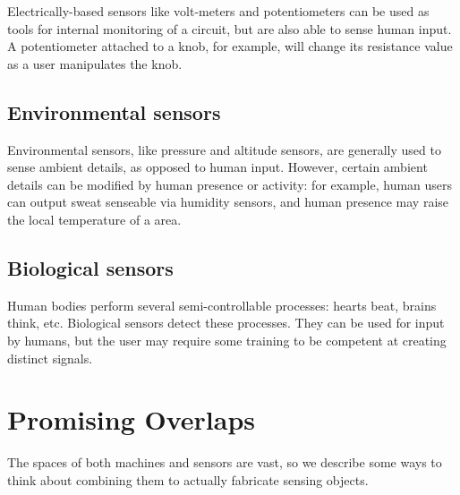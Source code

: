 Electrically-based sensors like volt-meters and potentiometers can be used as tools for internal monitoring of a circuit, but are also able to sense human input. A potentiometer attached to a knob, for example, will change its resistance value as a user manipulates the knob.

\subsection{Environmental sensors}

Environmental sensors, like pressure and altitude sensors, are generally used to sense ambient details, as opposed to human input. However, certain ambient details can be modified by human presence or activity: for example, human users can output sweat senseable via humidity sensors, and human presence may raise the local temperature of a area.

\subsection{Biological sensors}

Human bodies perform several semi-controllable processes: hearts beat, brains think, etc. Biological sensors detect these processes. They can be used for input by humans, but the user may require some training to be competent at creating distinct signals.

\section{Promising Overlaps}

The spaces of both machines and sensors are vast, so we describe some ways to think about combining them to actually fabricate sensing objects.

